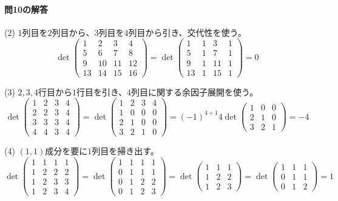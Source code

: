 \paragraph{問10の解答}

(2) $1$列目を$2$列目から、$3$列目を$4$列目から引き、交代性を使う。
\[
\det
\begin{pmatrix}
1 & 2 & 3 & 4 \\
5 & 6 & 7 & 8 \\
9 & 10 & 11 & 12 \\
13 & 14 & 15 & 16
\end{pmatrix}
=
\det
\begin{pmatrix}
1 & 1 & 3 & 1 \\
5 & 1 & 7 & 1 \\
9 & 1 & 11 & 1 \\
13 & 1 & 15 & 1
\end{pmatrix}
=0
\]

\noindent (3) $2, 3, 4$行目から$1$行目を引き、$4$列目に関する余因子展開を使う。
\[
\det
\begin{pmatrix}
1 & 2 & 3 & 4 \\
2 & 2 & 3 & 4 \\
3 & 3 & 3 & 4 \\
4 & 4 & 3 & 4
\end{pmatrix}
=
\det
\begin{pmatrix}
1 & 2 & 3 & 4 \\
1 & 0 & 0 & 0 \\
2 & 1 & 0 & 0 \\
3 & 2 & 1 & 0
\end{pmatrix}
= (-1)^{4 + 1} 4
\det
\begin{pmatrix}
1 & 0 & 0\\
2 & 1 & 0\\
3 & 2 & 1
\end{pmatrix}
= -4
\]

\noindent (4) $(1, 1)$成分を要に$1$列目を掃き出す。
\[
\det
\begin{pmatrix}
1 & 1 & 1 & 1 \\
1 & 2 & 2 & 2 \\
1 & 2 & 3 & 3 \\
1 & 2 & 3 & 4
\end{pmatrix}
= \det
\begin{pmatrix}
1 & 1 & 1 & 1 \\
0 & 1 & 1 & 1 \\
0 & 1 & 2 & 2 \\
0 & 1 & 2 & 3
\end{pmatrix}
= 
\det
\begin{pmatrix}
1 & 1 & 1 \\
1 & 2 & 2 \\
1 & 2 & 3
\end{pmatrix}
=
\det
\begin{pmatrix}
1 & 1 & 1 \\
0 & 1 & 1 \\
0 & 1 & 2
\end{pmatrix}
= 1
\]

